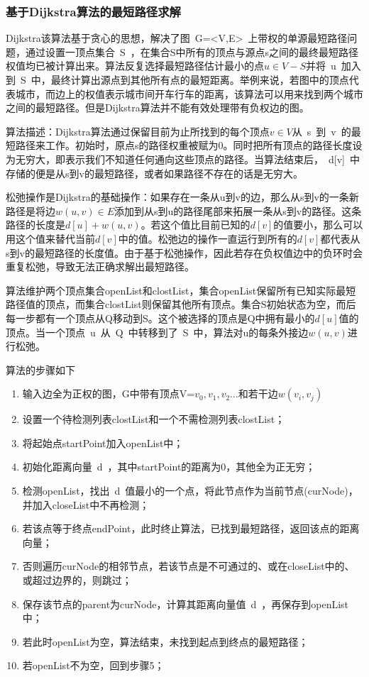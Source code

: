 \subsubsection{基于Dijkstra算法的最短路径求解}
\par Dijkstra该算法基于贪心的思想，解决了图~G=<V,E>~上带权的单源最短路径问题，通过设置一顶点集合~S~，在集合S中所有的顶点与源点s之间的最终最短路径权值均已被计算出来。算法反复选择最短路径估计最小的点$u\in V-S$并将~u~加入到~S~中，最终计算出源点到其他所有点的最短距离。举例来说，若图中的顶点代表城市，而边上的权值表示城市间开车行车的距离，该算法可以用来找到两个城市之间的最短路径。但是Dijkstra算法并不能有效处理带有负权边的图。
\par 算法描述：Dijkstra算法通过保留目前为止所找到的每个顶点$v\in V$从~s~到~v~的最短路径来工作。初始时，原点s的路径权重被赋为0。同时把所有顶点的路径长度设为无穷大，即表示我们不知道任何通向这些顶点的路径。当算法结束后，~d[v]~中存储的便是从s到v的最短路径，或者如果路径不存在的话是无穷大。
\par 松弛操作是Dijkstra的基础操作：如果存在一条从u到v的边，那么从s到v的一条新路径是将边$w(u,v)\in E$添加到从s到u的路径尾部来拓展一条从s到v的路径。这条路径的长度是$d[u]+w(u,v)$。若这个值比目前已知的$d[v]$的值要小，那么可以用这个值来替代当前$d[v]$中的值。松弛边的操作一直运行到所有的$d[v]$都代表从s到v的最短路径的长度值。由于基于松弛操作，因此若存在负权值边中的负环时会重复松弛，导致无法正确求解出最短路径。
\par 算法维护两个顶点集合openList和clostList，集合openList保留所有已知实际最短路径值的顶点，而集合clostList则保留其他所有顶点。集合S初始状态为空，而后每一步都有一个顶点从Q移动到S。这个被选择的顶点是Q中拥有最小的$d[u]$值的顶点。当一个顶点~u~从~Q~中转移到了~S~中，算法对u的每条外接边$w(u,v)$进行松弛。
\par 算法的步骤如下
\begin{enumerate}
    \item 输入边全为正权的图，G中带有顶点V=$v_0,v_1,v_2\dots$和若干边$w(v_i,v_j)$
    \item 设置一个待检测列表clostList和一个不需检测列表clostList；
    \item 将起始点startPoint加入openList中；
    \item 初始化距离向量~d~，其中startPoint的距离为0，其他全为正无穷；
    \item 检测openList，找出~d~值最小的一个点，将此节点作为当前节点(curNode)，并加入closeList中不再检测；
    \item 若该点等于终点endPoint，此时终止算法，已找到最短路径，返回该点的距离向量；
    \item 否则遍历curNode的相邻节点，若该节点是不可通过的、或在closeList中的、或超过边界的，则跳过；
    \item 保存该节点的parent为curNode，计算其距离向量值~d~，再保存到openList中；
    \item 若此时openList为空，算法结束，未找到起点到终点的最短路径；
    \item 若openList不为空，回到步骤5；
\end{enumerate}

